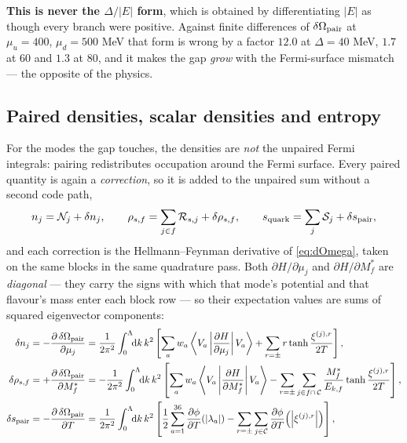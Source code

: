 \documentclass[11pt,a4paper]{article}
\newcommand{\Mstar}{M^{*}}
\begin{document}
\textbf{This is never the $\Delta/|E|$ form}, which is obtained by
differentiating $|E|$ as though every branch were positive. Against finite
differences of $\delta\Omega_{\rm pair}$ at $\mu_u=400$, $\mu_d=500$ MeV that
form is wrong by a factor $12.0$ at $\Delta=40$ MeV, $1.7$ at $60$ and $1.3$
at $80$, and it makes the gap \emph{grow} with the Fermi-surface mismatch ---
the opposite of the physics.

\subsection{Paired densities, scalar densities and entropy}
\label{sec:paired}

For the modes the gap touches, the densities are \emph{not} the unpaired Fermi
integrals: pairing redistributes occupation around the Fermi surface. Every
paired quantity is again a \emph{correction}, so it is added to the unpaired
sum without a second code path,
\begin{equation}
n_j = \mathcal N_j + \delta n_j,\qquad
\rho_{s,f} = \sum_{j\in f}\mathcal R_{s,j} + \delta\rho_{s,f},\qquad
s_{\rm quark} = \sum_j \mathcal S_j + \delta s_{\rm pair},
\label{eq:pairedsums}
\end{equation}
and each correction is the Hellmann--Feynman derivative of \eqref{eq:dOmega},
taken on the same blocks in the same quadrature pass. Both
$\partial H/\partial\mu_j$ and $\partial H/\partial\Mstar_f$ are
\emph{diagonal} --- they carry the signs with which that mode's potential and
that flavour's mass enter each block row --- so their expectation values are
sums of squared eigenvector components:
\begin{align}
\delta n_j &= -\frac{\partial\,\delta\Omega_{\rm pair}}{\partial\mu_j}
 = \frac{1}{2\pi^2}\int_0^{\Lambda}\!\!\mathrm dk\,k^2\left[
 \sum_{a} w_a \left\langle V_a\left|\frac{\partial H}{\partial\mu_j}
 \right|V_a\right\rangle
 + \sum_{r=\pm} r\tanh\frac{\xi^{(j),r}}{2T}\right],
\label{eq:dn}\\
\delta\rho_{s,f} &= +\frac{\partial\,\delta\Omega_{\rm pair}}{\partial\Mstar_f}
 = -\frac{1}{2\pi^2}\int_0^{\Lambda}\!\!\mathrm dk\,k^2\left[
 \sum_{a} w_a \left\langle V_a\left|\frac{\partial H}{\partial\Mstar_f}
 \right|V_a\right\rangle
 - \sum_{r=\pm}\sum_{j\in f\cap\,\mathcal C}\frac{\Mstar_f}{E_{k,f}}
   \tanh\frac{\xi^{(j),r}}{2T}\right],
\label{eq:drhos}\\
\delta s_{\rm pair} &= -\frac{\partial\,\delta\Omega_{\rm pair}}{\partial T}
 = \frac{1}{2\pi^2}\int_0^{\Lambda}\!\!\mathrm dk\,k^2\left[
 \frac12\sum_{a=1}^{36}\frac{\partial\phi}{\partial T}\!\left(|\lambda_a|\right)
 - \sum_{r=\pm}\sum_{j\in\mathcal C}
   \frac{\partial\phi}{\partial T}\!\left(\left|\xi^{(j),r}\right|\right)\right],
\label{eq:ds}
\end{align}
\end{document}

